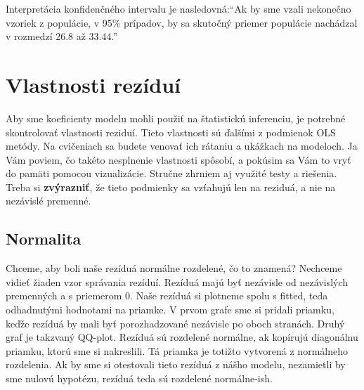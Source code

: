 Interpretácia konfidenčného intervalu je nasledovná:``Ak by sme vzali
nekonečno vzoriek z populácie, v 95\% prípadov, by sa skutočný priemer
populácie nachádzal v rozmedzí 26.8 až 33.44.''

\newpage

\hypertarget{vlastnosti-reziduuxed}{%
\section{Vlastnosti rezíduí}\label{vlastnosti-reziduuxed}}

Aby sme koeficienty modelu mohli použiť na štatistickú inferenciu, je
potrebné skontrolovať vlastnosti reziduí. Tieto vlastnosti sú ďalšími z
podmienok OLS metódy. Na cvičeniach sa budete venovať ich rátaniu a
ukážkach na modeloch. Ja Vám poviem, čo takéto nesplnenie vlastnosti
spôsobí, a pokúsim sa Vám to vryť do pamäti pomocou vizualizácie.
Stručne zhrniem aj využité testy a riešenia. Treba si
\textbf{zvýrazniť}, že tieto podmienky sa vzťahujú len na reziduá, a nie
na nezávislé premenné.

\hypertarget{normalita}{%
\subsection{Normalita}\label{normalita}}

Chceme, aby boli naše rezíduá normálne rozdelené, čo to znamená?
Nechceme vidieť žiaden vzor správania rezíduí. Rezíduá majú byť
nezávisle od nezávislých premenných a s priemerom 0. Naše rezíduá si
plotneme spolu s fitted, teda odhadnutými hodnotami na priamke. V prvom
grafe sme si pridali priamku, keďže rezíduá by mali byť porozhadzované
nezávisle po oboch stranách. Druhý graf je takzvaný QQ-plot. Rezíduá sú
rozdelené normálne, ak kopírujú diagonálnu priamku, ktorú sme si
nakreslili. Tá priamka je totižto vytvorená z normálneho rozdelenia. Ak
by sme si otestovali tieto rezíduá z nášho modelu, nezamietli by sme
nulovú hypotézu, rezíduá teda sú rozdelené normálne-ish.

\begin{Shaded}
\begin{Highlighting}[]

\NormalTok{(}\NormalTok{(}\NormalTok{, }\NormalTok{))}

\OperatorTok{$}\OperatorTok{$} \NormalTok{)}
\NormalTok{(}\NormalTok{, }\NormalTok{)}

\OperatorTok{$}
\OperatorTok{$}
\end{Highlighting}
\end{Shaded}

